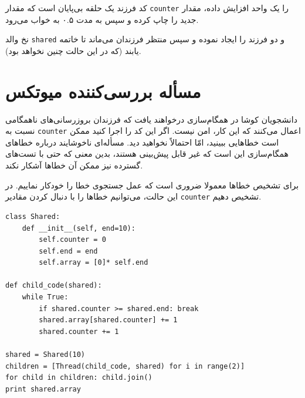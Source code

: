 \documentclass{book}
\begin{document}
    کد فرزند یک حلقه بی‌پایان است که مقدار {\tt counter} را یک واحد افزایش داده، مقدار جدید را چاپ کرده و سپس به مدت ۰.۵ به خواب می‌رود. 

    نخ والد  {\tt shared} و دو فرزند را ایجاد نموده و سپس منتظر فرزندان می‌ماند تا خاتمه یابند (که در این حالت چنین نخواهد بود).

\section{مسأله بررسی‌کننده میوتکس}

    دانشجویان کوشا در همگام‌سازی درخواهند یافت که فرزندان بروزرسانی‌های ناهمگامی نسبت به {\tt counter} اعمال می‌کنند که این کار، امن نیست. 
    اگر این کد را اجرا کنید ممکن است خطاهایی ببینید، امّا احتمالاً نخواهید دید. مسأله‌ای ناخوشایند درباره خطاهای همگام‌سازی این است که غیر قابل پیش‌بینی هستند، 
    بدین معنی که حتی با تست‌های  گسترده نیز  ممکن آن خطاها  آشکار نکند.
    

    برای تشخیص خطاها معمولا ضروری است که عمل جستجوی خطا را خودکار نماییم. 
    در این حالت، می‌توانیم خطاها را با دنبال کردن مقادیر  {\tt counter} تشخیص دهیم. 

\begin{latin}
\begin{lstlisting}
class Shared:
    def __init__(self, end=10):
        self.counter = 0
        self.end = end
        self.array = [0]* self.end

def child_code(shared):
    while True:
        if shared.counter >= shared.end: break
        shared.array[shared.counter] += 1
        shared.counter += 1

shared = Shared(10)
children = [Thread(child_code, shared) for i in range(2)]
for child in children: child.join()
print shared.array
\end{lstlisting}
\end{latin}
\end{document}
